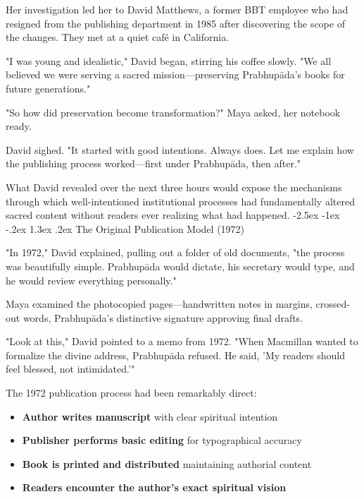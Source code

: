 \documentclass[12pt,twoside]{book}
\makeatletter
\renewcommand\section{\@startsection{section}{1}{\z@}%
{-2.5ex \@plus -1ex \@minus -.2ex}%
{1.3ex \@plus.2ex}%
{\normalfont\Large\bfseries}}
\makeatother
\begin{document}
Her investigation led her to David Matthews, a former BBT employee who had resigned from the publishing department in 1985 after discovering the scope of the changes. They met at a quiet café in California.

"I was young and idealistic," David began, stirring his coffee slowly. "We all believed we were serving a sacred mission—preserving Prabhupāda's books for future generations."

"So how did preservation become transformation?" Maya asked, her notebook ready.

David sighed. "It started with good intentions. Always does. Let me explain how the publishing process worked—first under Prabhupāda, then after."

What David revealed over the next three hours would expose the mechanisms through which well-intentioned institutional processes had fundamentally altered sacred content without readers ever realizing what had happened.
\section{The Original Publication Model (1972)}
\label{sec:org2c042e6}

"In 1972," David explained, pulling out a folder of old documents, "the process was beautifully simple. Prabhupāda would dictate, his secretary would type, and he would review everything personally."

Maya examined the photocopied pages—handwritten notes in margins, crossed-out words, Prabhupāda's distinctive signature approving final drafts.

"Look at this," David pointed to a memo from 1972. "When Macmillan wanted to formalize the divine address, Prabhupāda refused. He said, 'My readers should feel blessed, not intimidated.'"

The 1972 publication process had been remarkably direct:
\begin{itemize}
\item \textbf{\textbf{Author writes manuscript}} with clear spiritual intention
\item \textbf{\textbf{Publisher performs basic editing}} for typographical accuracy
\item \textbf{\textbf{Book is printed and distributed}} maintaining authorial content
\item \textbf{\textbf{Readers encounter the author's exact spiritual vision}}
\end{itemize}
\end{document}
